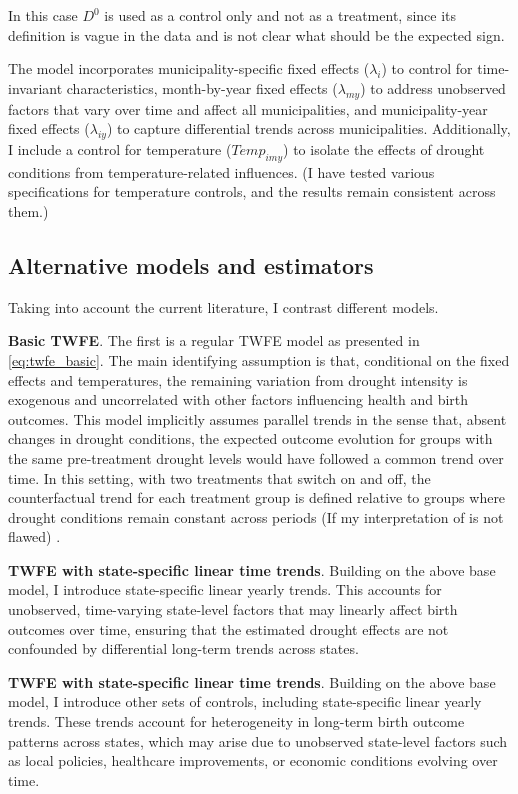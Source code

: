 \documentclass[12pt, oneside]{article}      %
\begin{document}
In this case $D^0$ is used as a control only and not as a treatment, since its definition is vague in the data and is not clear what should be the expected sign.

The model incorporates municipality-specific fixed effects ($\lambda_i$) to control for time-invariant characteristics, month-by-year fixed effects ($\lambda_{my}$) to address unobserved factors that vary over time and affect all municipalities, and municipality-year fixed effects ($\lambda_{iy}$) to capture differential trends across municipalities. Additionally, I include a control for temperature ($Temp_{imy}$) to isolate the effects of drought conditions from temperature-related influences. (I have tested various specifications for temperature controls, and the results remain consistent across them.)

\subsection{Alternative models and estimators}

Taking into account the current literature, I contrast different models.

\textbf{Basic TWFE}. The first is a regular TWFE model as presented in \ref{eq:twfe_basic}. The main identifying assumption is that, conditional on the fixed effects and temperatures, the remaining variation from drought intensity is exogenous and uncorrelated with other factors influencing health and birth outcomes. This model implicitly assumes parallel trends in the sense that, absent changes in drought conditions, the expected outcome evolution for groups with the same pre-treatment drought levels would have followed a common trend over time. In this setting, with two treatments that switch on and off, the counterfactual trend for each treatment group is defined relative to groups where drought conditions remain constant across periods (If my interpretation of \cite{deChaisemartin20203} is not flawed) .

\textbf{TWFE with state-specific linear time trends}. Building on the above base model, I introduce state-specific linear yearly trends. This accounts for unobserved, time-varying state-level factors that may linearly affect birth outcomes over time, ensuring that the estimated drought effects are not confounded by differential long-term trends across states.

\textbf{TWFE with state-specific linear time trends}. Building on the above base model, I introduce other sets of controls, including state-specific linear yearly trends. These trends account for heterogeneity in long-term birth outcome patterns across states, which may arise due to unobserved state-level factors such as local policies, healthcare improvements, or economic conditions evolving over time. 
\end{document}
